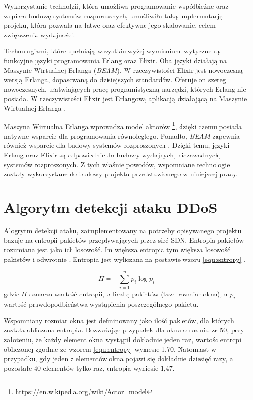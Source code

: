 Wykorzystanie technolgii, która umożliwa programowanie współbieżne oraz wspiera
budowę systemów rozporosznych, umożliwiło taką implementację projeku, która
pozwala na łatwe oraz efektywne jego skalowanie, celem zwiększenia wydajności.

Technologiami, które spełniają wszystkie wyżej wymienione wytyczne są funkcyjne
języki programowania Erlang oraz Elixir. Oba języki działają na Maszynie
Wirtualnej Erlanga (\textit{BEAM}). W rzeczywistości Elixir jest nowoczesną wersją
Erlanga, dopasowaną do dzisiejszych standardów. Oferuje on szereg nowoczesnych,
ułatwiających pracę programistyczną narzędzi, których Erlang nie posiada. W
rzeczywistości Elixir jest Erlangową aplikacją działającą na Maszynie Wirtualnej
Erlanga \cite{thebeambook}.

Maszyna Wirtualna Erlanga wprowadza model aktorów
\footnote{https://en.wikipedia.org/wiki/Actor\_model}, dzięki czemu posiada
natywne wsparcie dla programowania równoległego. Ponadto, \textit{BEAM} zapewnia
również wsparcie dla budowy systemów rozproszonych \cite{lyserlang}. Dzięki
temu, języki Erlang oraz Elixir są odpowiednie do budowy wydajnych,
niezawodnych, systemów rozproszonych. Z tych właśnie powodów, wspomniane
technologie zostały wykorzystane do budowy projektu przedstawionego w niniejszej
pracy.

\section{Algorytm detekcji ataku DDoS} \label{algorithm}

Alogrytm detekcji ataku, zaimplementowany na potrzeby opisywanego projektu
bazuje na entropii pakietów przepływających przez sieć SDN. Entropia pakietów
rozumiana jest jako ich losowość. Im większa entropia tym większa losowość
pakietów i odwrotnie \cite{mainddosarticle}. Entropia jest wyliczana na postawie
wzoru \ref{equ:entropy} \cite{mainddosarticle}.

\begin{equation}
H = -\sum_{i=1}^{n}p_{i}\log_{}p_{i}
\label{equ:entropy}
\end{equation}
gdzie $H$ oznacza wartość entropii, $n$ liczbę pakietów (tzw. rozmiar okna),
a $p_{i}$ wartość prawdopodbieństwa wystąpienia poszczególnego pakietu.

Wspomniany rozmiar okna jest defininowany jako ilość pakietów, dla których
została obliczona entropia. Rozważając przypadek dla okna o rozmiarze 50, przy
założeniu, że każdy element okna wystąpił dokładnie jeden raz, wartośc entropi
obliczonej zgodnie ze wzorem \ref{equ:entropy} wyniesie 1,70. Natomiast w
przypadku, gdy jeden z elementów okna pojawi się dokładnie dziesięć razy, a
pozostałe 40 elementów tylko raz, entropia wyniesie 1,47.

